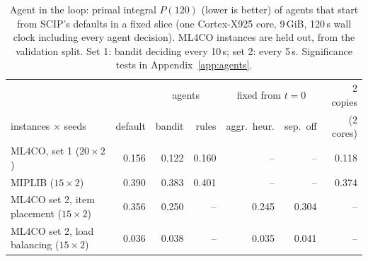 \begin{table}[t]\centering\small
\setlength{\tabcolsep}{4pt}\begin{tabular}{lrrrrrr}
\toprule
 & & \multicolumn{2}{c}{agents} & \multicolumn{2}{c}{fixed from $t=0$} & 2 copies \\ instances $\times$ seeds & default & bandit & rules & aggr.\ heur. & sep.\ off & (2 cores) \\
\midrule
ML4CO, set 1 ($20\times2$) & 0.156 & 0.122 & 0.160 & -- & -- & 0.118 \\
MIPLIB ($15\times2$) & 0.390 & 0.383 & 0.401 & -- & -- & 0.374 \\
ML4CO set 2, item placement ($15\times2$) & 0.356 & 0.250 & -- & 0.245 & 0.304 & -- \\
ML4CO set 2, load balancing ($15\times2$) & 0.036 & 0.038 & -- & 0.035 & 0.041 & -- \\
\bottomrule
\end{tabular}
\caption{Agent in the loop: primal integral $P(120)$ (lower is better) of agents that start from SCIP's defaults in a fixed slice (one Cortex-X925 core, 9\,GiB, 120\,s wall clock including every agent decision). ML4CO instances are held out, from the validation split. Set 1: bandit deciding every 10\,s; set 2: every 5\,s. Significance tests in Appendix~\ref{app:agents}.}\label{tab:agent}
\end{table}